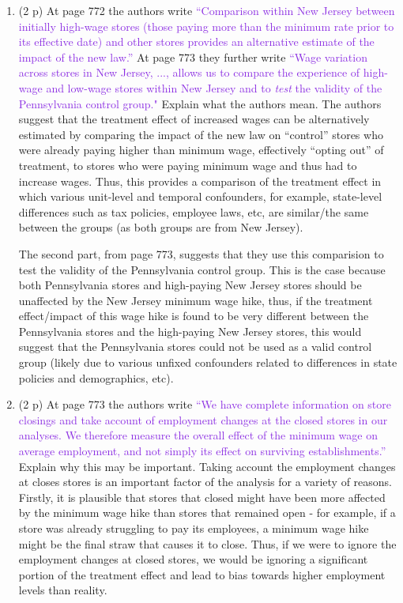 \documentclass[
]{article}
\begin{document}
\begin{enumerate}
\def\labelenumi{\arabic{enumi}.}
\setcounter{enumi}{19}
\item
  (2 p) At page 772 the authors write
  \textcolor{BlueViolet}{``Comparison within New Jersey between initially high-wage stores (those paying more than the minimum rate prior to its effective date) and other stores provides an alternative estimate of the impact of the new law.''}
  At page 773 they further write
  \textcolor{BlueViolet}{``Wage variation across stores in New Jersey, ..., allows us to compare the experience of high-wage and low-wage stores within New Jersey and to \textit{test} the validity of the Pennsylvania control group."}
  Explain what the authors mean. The authors suggest that the treatment
  effect of increased wages can be alternatively estimated by comparing
  the impact of the new law on ``control'' stores who were already
  paying higher than minimum wage, effectively ``opting out'' of
  treatment, to stores who were paying minimum wage and thus had to
  increase wages. Thus, this provides a comparison of the treatment
  effect in which various unit-level and temporal confounders, for
  example, state-level differences such as tax policies, employee laws,
  etc, are similar/the same between the groups (as both groups are from
  New Jersey).

  The second part, from page 773, suggests that they use this
  comparision to test the validity of the Pennsylvania control group.
  This is the case because both Pennsylvania stores and high-paying New
  Jersey stores should be unaffected by the New Jersey minimum wage
  hike, thus, if the treatment effect/impact of this wage hike is found
  to be very different between the Pennsylvania stores and the
  high-paying New Jersey stores, this would suggest that the
  Pennsylvania stores could not be used as a valid control group (likely
  due to various unfixed confounders related to differences in state
  policies and demographics, etc).
\item
  (2 p) At page 773 the authors write
  \textcolor{BlueViolet}{``We have complete information on store closings and take account of employment changes at the closed stores in our analyses. We therefore measure the overall effect of the minimum wage on average employment, and not simply its effect on surviving establishments.''}
  Explain why this may be important. Taking account the employment
  changes at closes stores is an important factor of the analysis for a
  variety of reasons. Firstly, it is plausible that stores that closed
  might have been more affected by the minimum wage hike than stores
  that remained open - for example, if a store was already struggling to
  pay its employees, a minimum wage hike might be the final straw that
  causes it to close. Thus, if we were to ignore the employment changes
  at closed stores, we would be ignoring a significant portion of the
  treatment effect and lead to bias towards higher employment levels
  than reality.


\end{enumerate}
\end{document}
